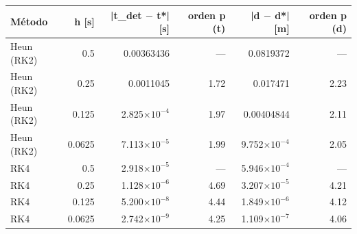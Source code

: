 {\footnotesize
\begin{longtable}{lrrrrr}
\toprule
\textbf{Método} & \textbf{h [s]} & \textbf{|t\_det $-$ t*| [s]} & \textbf{orden p (t)} & \textbf{|d $-$ d*| [m]} & \textbf{orden p (d)} \\
\midrule
\endhead
Heun (RK2) & 0.5 & 0.00363436 & — & 0.0819372 & — \\
Heun (RK2) & 0.25 & 0.0011045 & 1.72 & 0.017471 & 2.23 \\
Heun (RK2) & 0.125 & 2.825$\times10^{-4}$ & 1.97 & 0.00404844 & 2.11 \\
Heun (RK2) & 0.0625 & 7.113$\times10^{-5}$ & 1.99 & 9.752$\times10^{-4}$ & 2.05 \\
RK4 & 0.5 & 2.918$\times10^{-5}$ & — & 5.946$\times10^{-4}$ & — \\
RK4 & 0.25 & 1.128$\times10^{-6}$ & 4.69 & 3.207$\times10^{-5}$ & 4.21 \\
RK4 & 0.125 & 5.200$\times10^{-8}$ & 4.44 & 1.849$\times10^{-6}$ & 4.12 \\
RK4 & 0.0625 & 2.742$\times10^{-9}$ & 4.25 & 1.109$\times10^{-7}$ & 4.06 \\
\bottomrule
\end{longtable}
}
